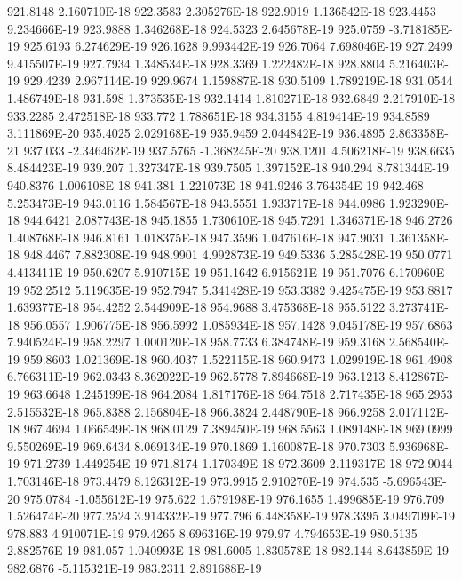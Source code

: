 921.8148  2.160710E-18
922.3583  2.305276E-18
922.9019  1.136542E-18
923.4453  9.234666E-19
923.9888  1.346268E-18
924.5323  2.645678E-19
925.0759  -3.718185E-19
925.6193  6.274629E-19
926.1628  9.993442E-19
926.7064  7.698046E-19
927.2499  9.415507E-19
927.7934  1.348534E-18
928.3369  1.222482E-18
928.8804  5.216403E-19
929.4239  2.967114E-19
929.9674  1.159887E-18
930.5109  1.789219E-18
931.0544  1.486749E-18
931.598  1.373535E-18
932.1414  1.810271E-18
932.6849  2.217910E-18
933.2285  2.472518E-18
933.772  1.788651E-18
934.3155  4.819414E-19
934.8589  3.111869E-20
935.4025  2.029168E-19
935.9459  2.044842E-19
936.4895  2.863358E-21
937.033  -2.346462E-19
937.5765  -1.368245E-20
938.1201  4.506218E-19
938.6635  8.484423E-19
939.207  1.327347E-18
939.7505  1.397152E-18
940.294  8.781344E-19
940.8376  1.006108E-18
941.381  1.221073E-18
941.9246  3.764354E-19
942.468  5.253473E-19
943.0116  1.584567E-18
943.5551  1.933717E-18
944.0986  1.923290E-18
944.6421  2.087743E-18
945.1855  1.730610E-18
945.7291  1.346371E-18
946.2726  1.408768E-18
946.8161  1.018375E-18
947.3596  1.047616E-18
947.9031  1.361358E-18
948.4467  7.882308E-19
948.9901  4.992873E-19
949.5336  5.285428E-19
950.0771  4.413411E-19
950.6207  5.910715E-19
951.1642  6.915621E-19
951.7076  6.170960E-19
952.2512  5.119635E-19
952.7947  5.341428E-19
953.3382  9.425475E-19
953.8817  1.639377E-18
954.4252  2.544909E-18
954.9688  3.475368E-18
955.5122  3.273741E-18
956.0557  1.906775E-18
956.5992  1.085934E-18
957.1428  9.045178E-19
957.6863  7.940524E-19
958.2297  1.000120E-18
958.7733  6.384748E-19
959.3168  2.568540E-19
959.8603  1.021369E-18
960.4037  1.522115E-18
960.9473  1.029919E-18
961.4908  6.766311E-19
962.0343  8.362022E-19
962.5778  7.894668E-19
963.1213  8.412867E-19
963.6648  1.245199E-18
964.2084  1.817176E-18
964.7518  2.717435E-18
965.2953  2.515532E-18
965.8388  2.156804E-18
966.3824  2.448790E-18
966.9258  2.017112E-18
967.4694  1.066549E-18
968.0129  7.389450E-19
968.5563  1.089148E-18
969.0999  9.550269E-19
969.6434  8.069134E-19
970.1869  1.160087E-18
970.7303  5.936968E-19
971.2739  1.449254E-19
971.8174  1.170349E-18
972.3609  2.119317E-18
972.9044  1.703146E-18
973.4479  8.126312E-19
973.9915  2.910270E-19
974.535  -5.696543E-20
975.0784  -1.055612E-19
975.622  1.679198E-19
976.1655  1.499685E-19
976.709  1.526474E-20
977.2524  3.914332E-19
977.796  6.448358E-19
978.3395  3.049709E-19
978.883  4.910071E-19
979.4265  8.696316E-19
979.97  4.794653E-19
980.5135  2.882576E-19
981.057  1.040993E-18
981.6005  1.830578E-18
982.144  8.643859E-19
982.6876  -5.115321E-19
983.2311  2.891688E-19
